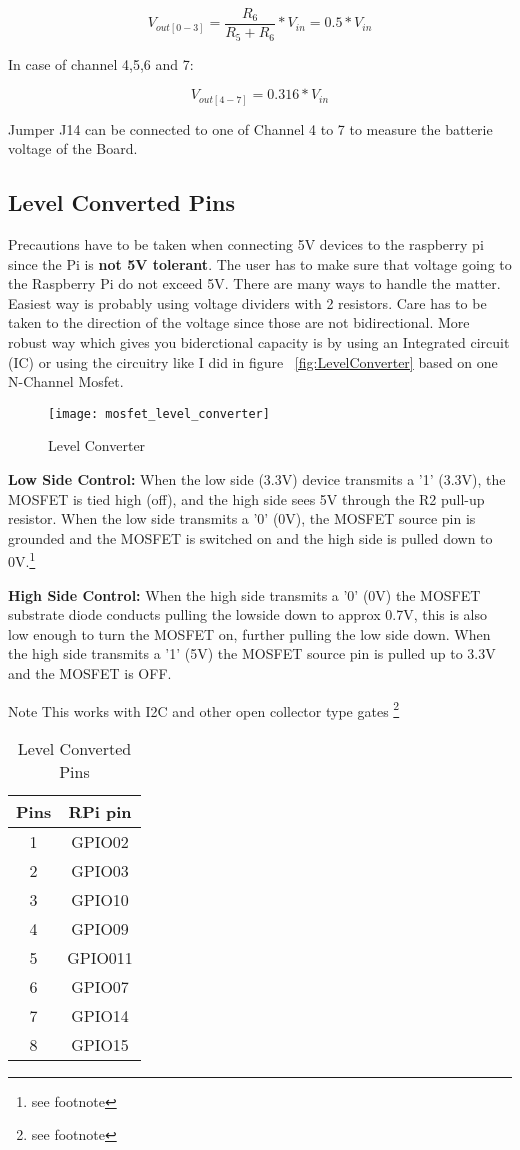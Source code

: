 \documentclass[
10pt, %
a4paper, %
oneside, %
headinclude,footinclude, %
BCOR=5mm, %
table,
]{scrartcl}
\begin{document}
\[ V_{ out[0-3] } = \frac{ R_{6} }{ R_{5} + R_{6} } * V_{in}  = 0.5* V_{in}\]

In case of channel 4,5,6 and 7:

\[ V_{out[4-7]} = 0.316 * V_{in}\]

Jumper J14 can be connected to one of Channel 4 to 7 to measure the batterie voltage of the Board.

\subsection{Level Converted Pins}
Precautions have to be taken when connecting 5V devices to the raspberry pi since the Pi is \textbf{not 5V tolerant}. The user has to make sure that voltage going to the Raspberry Pi do not exceed 5V. There are many ways to handle the matter. Easiest way is probably using voltage dividers with 2 resistors. Care has to be taken to the direction of the voltage since those are not bidirectional. More robust way which gives you biderctional capacity is by using an Integrated circuit (IC) or using the circuitry like I did in figure  ~\vref{fig:LevelConverter} based on one N-Channel Mosfet.


\begin{figure}[h]
\centering
\texttt{[image: mosfet\_level\_converter]} 
\caption[Level Converter]{Level Converter \footnotemark}
\label{fig:LevelConverter}
\end{figure}

\textbf{Low Side Control:} When the low side (3.3V) device transmits a '1' (3.3V), the MOSFET is tied high (off), and the high side sees 5V through the R2 pull-up resistor. When the low side transmits a '0' (0V), the MOSFET source pin is grounded and the MOSFET is switched on and the high side is pulled down to 0V.\footnote{see footnote }

\textbf{High Side Control:} When the high side transmits a '0' (0V) the MOSFET substrate diode conducts pulling the lowside down to approx 0.7V, this is also low enough to turn the MOSFET on, further pulling the low side down. When the high side transmits a '1' (5V) the MOSFET source pin is pulled up to 3.3V and the MOSFET is OFF.

Note This works with I2C and other open collector type gates \footnote{see footnote }


\begin{table}[H]
\centering
\begin{tabular}{cc}
\hline
\textbf{Pins} & \textbf{RPi pin} \\
\hline
1  & GPIO02 \\
2  & GPIO03 \\
3  & GPIO10 \\
4  & GPIO09 \\
5  & GPIO011 \\
6  & GPIO07 \\
7  & GPIO14 \\
8  & GPIO15 \\
\hline
\end{tabular}
\label{tab:label}
\caption{Level Converted Pins}
\end{table}
\end{document}
